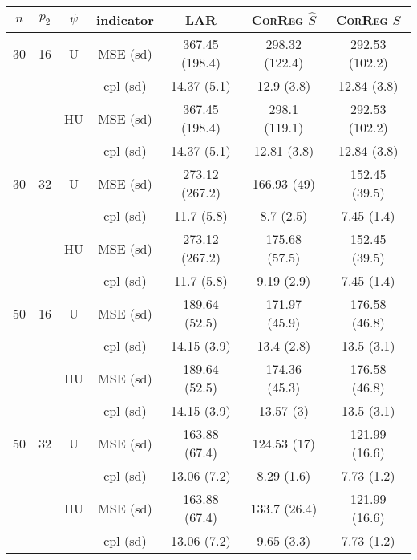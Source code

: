 \documentclass[11pt,a4paper]{article}
\begin{document}
\begin{table}[h!]
\centering
\begin{tabular}{|c|c|c|c|c|c|c|}
\hline 
$n$ & $p_2$&  $\psi$ &indicator &LAR  &    \textsc{CorReg} $\hat S$& \textsc{CorReg} $S$\\ 
\hline %
30 & 16 & U&MSE (sd) & 367.45 (198.4) & 298.32 (122.4) & 292.53 (102.2) \\
& & & cpl (sd) & 14.37 (5.1) & 12.9 (3.8) & 12.84 (3.8) \\
 &  &HU &MSE (sd) & 367.45 (198.4) & 298.1 (119.1) & 292.53 (102.2) \\
& & & cpl (sd) & 14.37 (5.1) & 12.81 (3.8) & 12.84 (3.8) \\
\hline %
30 & 32 & U & MSE (sd) & 273.12 (267.2) & 166.93 (49) & 152.45 (39.5) \\
& & & cpl (sd) & 11.7 (5.8) & 8.7 (2.5) & 7.45 (1.4) \\
 &  & HU & MSE (sd) & 273.12 (267.2) & 175.68 (57.5) & 152.45 (39.5) \\
& & & cpl (sd) & 11.7 (5.8) & 9.19 (2.9) & 7.45 (1.4) \\
\hline
\hline %
50 & 16 & U&	MSE (sd) & 189.64 (52.5) & 171.97 (45.9) & 176.58 (46.8) \\
& & & cpl (sd) & 14.15 (3.9) & 13.4 (2.8) & 13.5 (3.1) \\
 &  &HU &MSE (sd) & 189.64 (52.5) & 174.36 (45.3) & 176.58 (46.8) \\
& & & cpl (sd) & 14.15 (3.9) & 13.57 (3) & 13.5 (3.1) \\
\hline %
50 & 32 & U&MSE (sd) & 163.88 (67.4) & 124.53 (17) & 121.99 (16.6) \\
& & & cpl (sd) & 13.06 (7.2) & 8.29 (1.6) & 7.73 (1.2) \\
 &  &HU &MSE (sd) & 163.88 (67.4) & 133.7 (26.4) & 121.99 (16.6) \\
& & &cpl (sd) & 13.06 (7.2) & 9.65 (3.3) & 7.73 (1.2) \\

\end{tabular}
\end{table}
\end{document}
